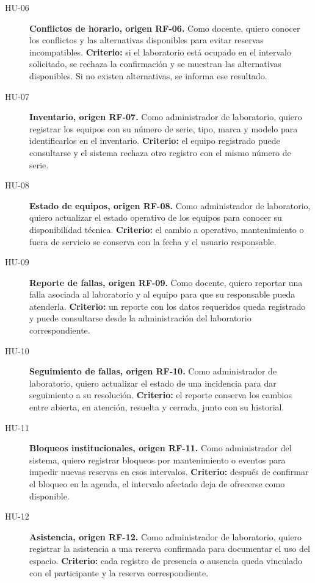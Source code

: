 {\begin{description}
    \item[HU-06] \textbf{Conflictos de horario, origen RF-06.}
    Como docente, quiero conocer los conflictos y las alternativas disponibles
    para evitar reservas incompatibles.
    \textbf{Criterio:} si el laboratorio está ocupado en el intervalo
    solicitado, se rechaza la confirmación y se muestran las alternativas
    disponibles. Si no existen alternativas, se informa ese resultado.

    \item[HU-07] \textbf{Inventario, origen RF-07.}
    Como administrador de laboratorio, quiero registrar los equipos con su
    número de serie, tipo, marca y modelo para identificarlos en el inventario.
    \textbf{Criterio:} el equipo registrado puede consultarse y el sistema
    rechaza otro registro con el mismo número de serie.

    \item[HU-08] \textbf{Estado de equipos, origen RF-08.}
    Como administrador de laboratorio, quiero actualizar el estado operativo
    de los equipos para conocer su disponibilidad técnica.
    \textbf{Criterio:} el cambio a operativo, mantenimiento o fuera de
    servicio se conserva con la fecha y el usuario responsable.

    \item[HU-09] \textbf{Reporte de fallas, origen RF-09.}
    Como docente, quiero reportar una falla asociada al laboratorio y al equipo
    para que su responsable pueda atenderla.
    \textbf{Criterio:} un reporte con los datos requeridos queda registrado
    y puede consultarse desde la administración del laboratorio correspondiente.

    \item[HU-10] \textbf{Seguimiento de fallas, origen RF-10.}
    Como administrador de laboratorio, quiero actualizar el estado de una
    incidencia para dar seguimiento a su resolución.
    \textbf{Criterio:} el reporte conserva los cambios entre abierta, en
    atención, resuelta y cerrada, junto con su historial.

    \item[HU-11] \textbf{Bloqueos institucionales, origen RF-11.}
    Como administrador del sistema, quiero registrar bloqueos por
    mantenimiento o eventos para impedir nuevas reservas en esos intervalos.
    \textbf{Criterio:} después de confirmar el bloqueo en la agenda, el
    intervalo afectado deja de ofrecerse como disponible.

    \item[HU-12] \textbf{Asistencia, origen RF-12.}
    Como administrador de laboratorio, quiero registrar la asistencia a una
    reserva confirmada para documentar el uso del espacio.
    \textbf{Criterio:} cada registro de presencia o ausencia queda vinculado
    con el participante y la reserva correspondiente.


\end{description}}
